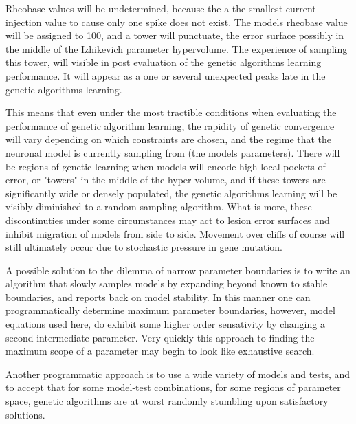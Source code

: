 Rheobase values will be undetermined, because the a the smallest current injection value to cause only one spike does not exist. The models rheobase value will be assigned to 100, and a tower will punctuate, the error surface possibly in the middle of the Izhikevich parameter hypervolume. The experience of sampling this tower, will visible in post evaluation of the genetic algorithms learning performance. It will appear as a one or several unexpected peaks late in the genetic algorithms learning.

This means that even under the most tractible conditions when evaluating the performance of genetic algorithm learning, the rapidity of genetic convergence will vary depending on which constraints are chosen, and the regime that the neuronal model is currently sampling from (the models parameters). There will be regions of genetic learning when models will encode high local pockets of error, or "towers" in the middle of the hyper-volume, and if these towers are significantly wide or densely populated, the genetic algorithms learning will be visibly diminished to a random sampling algorithm. What is more, these discontinuties under some circumstances may act to lesion error surfaces and inhibit migration of models from side to side. Movement over cliffs of course will still ultimately occur due to stochastic pressure in gene mutation.

A possible solution to the dilemma of narrow parameter boundaries is to write an algorithm that slowly samples models by expanding beyond known to stable boundaries, and reports back on model stability. In this manner one can programmatically determine maximum parameter boundaries, however, model equations used here, do exhibit some higher order sensativity by changing a second intermediate parameter. Very quickly this approach to finding the maximum scope of a parameter may begin to look like exhaustive search.

Another programmatic approach is to use a wide variety of models and tests, and to accept that for some model-test combinations, for some regions of parameter space, genetic algorithms are at worst  randomly stumbling upon satisfactory solutions.
